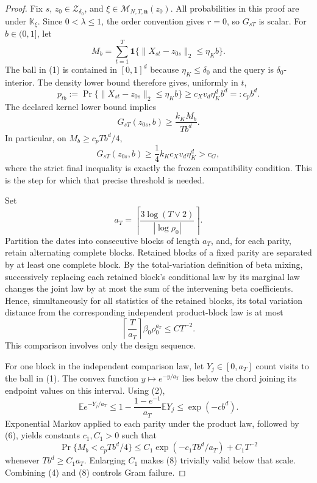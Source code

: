 \documentclass{article}
\begin{document}
\begin{proof}
Fix \(s\), \(z_0\in\mathcal Z_{\delta_0}\), and
\(\xi\in\mathcal M_{N,T,\mathbf n}(z_0)\).  All probabilities in this proof are under \(\mathbb K_\xi\).  Since \(0<\lambda\le1\), the order convention gives \(r=0\), so \(G_{sT}\) is scalar.  For \(b\in(0,1]\), let
\[
 M_b=\sum_{t=1}^{T}
 \mathbf1\{\|X_{st}-z_{0s}\|_2\le\eta_Kb\}.               \tag{1}
\]
The ball in (1) is contained in \([0,1]^d\) because
\(\eta_K\le\delta_0\) and the query is \(\delta_0\)-interior.  The density lower bound therefore gives, uniformly in \(t\),
\[
 p_{tb}:=\Pr\{\|X_{st}-z_{0s}\|_2\le\eta_Kb\}
 \ge c_Xv_d\eta_K^db^d=:c_pb^d.                            \tag{2}
\]
The declared kernel lower bound implies
\[
 G_{sT}(z_{0s},b)
 \ge\frac{k_KM_b}{Tb^d}.                                   \tag{3}
\]
In particular, on \(M_b\ge c_pTb^d/4\),
\[
 G_{sT}(z_{0s},b)\ge\frac14k_Kc_Xv_d\eta_K^d>c_G,          \tag{4}
\]
where the strict final inequality is exactly the frozen compatibility condition.  This is the step for which that precise threshold is needed.

Set
\[
 a_T=\left\lceil\frac{3\log(T\vee2)}{|\log\rho_0|}\right\rceil. \tag{5}
\]
Partition the dates into consecutive blocks of length \(a_T\), and, for each parity, retain alternating complete blocks.  Retained blocks of a fixed parity are separated by at least one complete block.  By the total-variation definition of beta mixing, successively replacing each retained block's conditional law by its marginal law changes the joint law by at most the sum of the intervening beta coefficients.  Hence, simultaneously for all statistics of the retained blocks, its total variation distance from the corresponding independent product-block law is at most
\[
 \left\lceil\frac{T}{a_T}\right\rceil
 \beta_0\rho_0^{a_T}\le CT^{-2}.                           \tag{6}
\]
This comparison involves only the design sequence.

For one block in the independent comparison law, let \(Y_j\in[0,a_T]\) count visits to the ball in (1).  The convex function \(y\mapsto e^{-y/a_T}\) lies below the chord joining its endpoint values on this interval.  Using (2),
\[
 \mathbb Ee^{-Y_j/a_T}
 \le1-\frac{1-e^{-1}}{a_T}\mathbb EY_j
 \le\exp(-c b^d).                                          \tag{7}
\]
Exponential Markov applied to each parity under the product law, followed by (6), yields constants \(c_1,C_1>0\) such that
\[
 \Pr\{M_b<c_pTb^d/4\}
 \le C_1\exp(-c_1Tb^d/a_T)+C_1T^{-2}                       \tag{8}
\]
whenever \(Tb^d\ge C_1a_T\).  Enlarging \(C_1\) makes (8) trivially valid below that scale.  Combining (4) and (8) controls Gram failure.


\end{proof}
\end{document}
